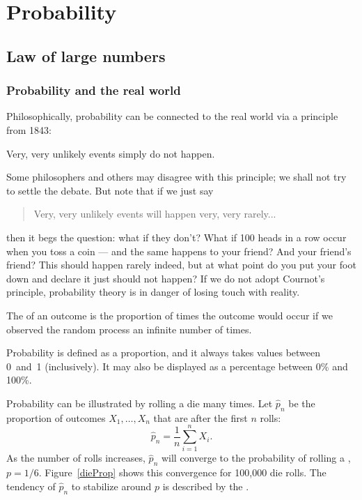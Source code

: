 \chapter{Probability}
\label{probability}


\section{Law of large numbers}

\subsection{Probability and the real world}
	Philosophically, probability can be connected to the real world via a principle from 1843:


	\begin{termBox}{
	Very, very unlikely events simply do not happen.}
	\end{termBox}


	Some philosophers and others may disagree with this principle; we shall not try to settle the debate. But note that if we just say
	\begin{quote}
		Very, very unlikely events will happen very, very rarely...
	\end{quote}
	then it begs the question: what if they don't? What if 100 heads in a row occur when you toss a coin --- and the same happens to your friend? And your friend's friend? This should happen rarely indeed, but at what point do you put your foot down and declare it just should not happen? If we do not adopt Cournot's principle, probability theory is in danger of losing touch with reality.



	\begin{termBox}{
	The  of an outcome is the proportion of times the outcome would occur if we observed the random process an infinite number of times.}
	\end{termBox}

	Probability is defined as a proportion, and it always takes values between 0~and~1 (inclusively).
	It may also be displayed as a percentage between 0\% and 100\%.

	Probability can be illustrated by rolling a die many times.
	Let $\hat{p}_n$ be the proportion of outcomes $X_1,\dots,X_n$ that are  after the first $n$ rolls:
	\[
		\hat p_n = \frac1n\sum_{i=1}^n X_i.
	\]
	As the number of rolls increases, $\hat{p}_n$ will converge to the probability of rolling a , $p = 1/6$.
	Figure~\ref{dieProp} shows this convergence for 100,000 die rolls.
	The tendency of $\hat{p}_n$ to stabilize around $p$ is described by the . 

